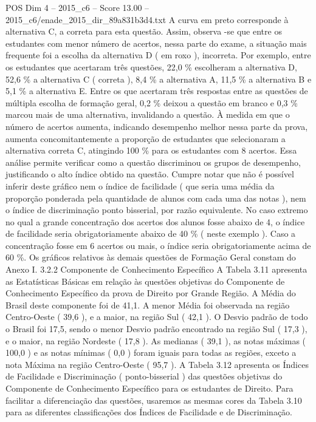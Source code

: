 \begin{textsample}{POS Dim 4 – 2015\_c6 – Score 13.00 – 2015\_c6/enade\_2015\_dir\_89a831b3d4.txt}
A curva em preto corresponde à alternativa C, a correta para esta questão.
Assim, observa -se que entre os estudantes com menor número de acertos, nessa parte do exame, a situação mais frequente foi a escolha da alternativa D ( em roxo ), incorreta.
Por exemplo, entre os estudantes que acertaram três questões, 22,0 \% escolheram a alternativa D, 52,6 \% a alternativa C ( correta ), 8,4 \% a alternativa A, 11,5 \% a alternativa B e 5,1 \% a alternativa E.
Entre os que acertaram três respostas entre as questões de múltipla escolha de formação geral, 0,2 \% deixou a questão em branco e 0,3 \% marcou mais de uma alternativa, invalidando a questão.
À medida em que o número de acertos aumenta, indicando desempenho melhor nessa parte da prova, aumenta concomitantemente a proporção de estudantes que selecionaram a alternativa correta C, atingindo 100 \% para os estudantes com 8 acertos.
Essa análise permite verificar como a questão discriminou os grupos de desempenho, justificando o alto índice obtido na questão.
Cumpre notar que não é possível inferir deste gráfico nem o índice de facilidade ( que seria uma média da proporção ponderada pela quantidade de alunos com cada uma das notas ), nem o índice de discriminação ponto bisserial, por razão equivalente.
No caso extremo no qual a grande concentração dos acertos dos alunos fosse abaixo de 4, o índice de facilidade seria obrigatoriamente abaixo de 40 \% ( neste exemplo ).
Caso a concentração fosse em 6 acertos ou mais, o índice seria obrigatoriamente acima de 60 \%.
Os gráficos relativos às demais questões de Formação Geral constam do Anexo I. 3.2.2 Componente de Conhecimento Específico A Tabela 3.11 apresenta as Estatísticas Básicas em relação às questões objetivas do Componente de Conhecimento Específico da prova de Direito por Grande Região.
A Média do Brasil deste componente foi de 41,1.
A menor Média foi observada na região Centro-Oeste ( 39,6 ), e a maior, na região Sul ( 42,1 ).
O Desvio padrão de todo o Brasil foi 17,5, sendo o menor Desvio padrão encontrado na região Sul ( 17,3 ), e o maior, na região Nordeste ( 17,8 ).
As medianas ( 39,1 ), as notas máximas ( 100,0 ) e as notas mínimas ( 0,0 ) foram iguais para todas as regiões, exceto a nota Máxima na região Centro-Oeste ( 95,7 ).
A Tabela 3.12 apresenta os Índices de Facilidade e Discriminação ( ponto-bisserial ) das questões objetivas do Componente de Conhecimento Específico para os estudantes de Direito.
Para facilitar a diferenciação das questões, usaremos as mesmas cores da Tabela 3.10 para as diferentes classificações dos Índices de Facilidade e de Discriminação.

\end{textsample}
